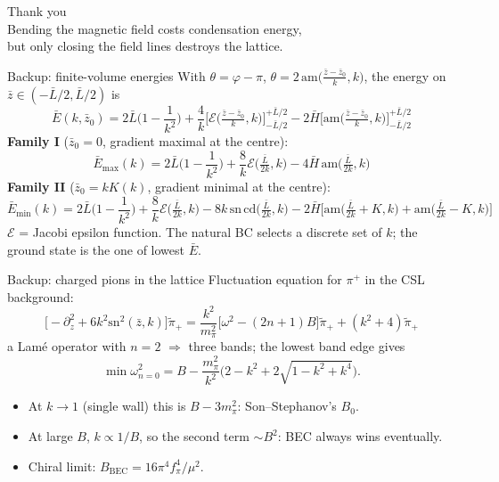 \documentclass[aspectratio=169,10pt]{beamer}
\newcommand{\fpi}{f_\pi}
\newcommand{\mpi}{m_\pi}
\newcommand{\Bbec}{B_{\mathrm{BEC}}}
\begin{document}
\begin{frame}[standout]
Thank you\\[4mm]
{\normalsize\rmfamily
Bending the magnetic field costs condensation energy,\\
but only closing the field lines destroys the lattice.}
\end{frame}

\appendix

\begin{frame}{Backup: finite-volume energies}
With $\theta=\varphi-\pi$, $\theta=2\,\mathrm{am}\big(\frac{\bar z-\bar z_0}{k},k\big)$,
the energy on $\bar z\in(-\bar L/2,\bar L/2)$ is
\[
 \bar E(k,\bar z_0)=2\bar L\Big(1-\frac1{k^2}\Big)
 +\frac4k\Big[\mathcal E\big(\tfrac{\bar z-\bar z_0}{k},k\big)\Big]_{-\bar L/2}^{+\bar L/2}
 -2\bar H\Big[\mathrm{am}\big(\tfrac{\bar z-\bar z_0}{k},k\big)\Big]_{-\bar L/2}^{+\bar L/2}
\]
\textbf{Family I} ($\bar z_0=0$, gradient maximal at the centre):
\[
 \bar E_{\max}(k)=2\bar L\Big(1-\frac1{k^2}\Big)+\frac8k\mathcal E\big(\tfrac{\bar L}{2k},k\big)
 -4\bar H\,\mathrm{am}\big(\tfrac{\bar L}{2k},k\big)
\]
\textbf{Family II} ($\bar z_0=kK(k)$, gradient minimal at the centre):
\[
 \bar E_{\min}(k)=2\bar L\Big(1-\frac1{k^2}\Big)+\frac8k\mathcal E\big(\tfrac{\bar L}{2k},k\big)
 -8k\,\mathrm{sn}\,\mathrm{cd}\big(\tfrac{\bar L}{2k},k\big)
 -2\bar H\Big[\mathrm{am}\big(\tfrac{\bar L}{2k}+K,k\big)+\mathrm{am}\big(\tfrac{\bar L}{2k}-K,k\big)\Big]
\]
$\mathcal E$ = Jacobi epsilon function. The natural BC selects a discrete set of
$k$; the ground state is the one of lowest $\bar E$.
\end{frame}

\begin{frame}{Backup: charged pions in the lattice}
Fluctuation equation for $\pi^+$ in the CSL background:
\[
 \big[-\partial_z^2+6k^2\mathrm{sn}^2(\bar z,k)\big]\tilde\pi_+
 =\frac{k^2}{\mpi^2}\big[\omega^2-(2n+1)B\big]\tilde\pi_++(k^2+4)\tilde\pi_+
\]
a Lam\'e operator with $n=2$ $\Rightarrow$ three bands; the lowest band edge gives
\[
 \min\omega^2_{n=0}=B-\frac{\mpi^2}{k^2}\big(2-k^2+2\sqrt{1-k^2+k^4}\big).
\]
\begin{itemize}
  \item At $k\to1$ (single wall) this is $B-3\mpi^2$: Son--Stephanov's $B_0$.
  \item At large $B$, $k\propto1/B$, so the second term $\sim B^2$: BEC always
        wins eventually.
  \item Chiral limit: $\Bbec=16\pi^4\fpi^4/\mu^2$.
\end{itemize}
\end{frame}
\end{document}
